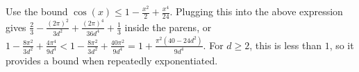 \documentclass{article}
\begin{document}
Use the bound $\cos(x)\leq1-\frac{x^2}{2}+\frac{x^4}{24}$. Plugging this into the above expression gives $\frac{2}{3}-\frac{(2\pi)^2}{3d^2}+\frac{(2\pi)^4}{36d^4}+\frac{1}{3}$ inside the parens, or $1-\frac{8\pi^2}{3d^2}+\frac{4\pi^4}{9d^4}<1-\frac{8\pi^2}{3d^2}+\frac{40\pi^2}{9d^4}=1+\frac{\pi^2(40-24d^2)}{9d^4}$. For $d\geq2$, this is less than $1$, so it provides a bound when repeatedly exponentiated.
\end{document}
